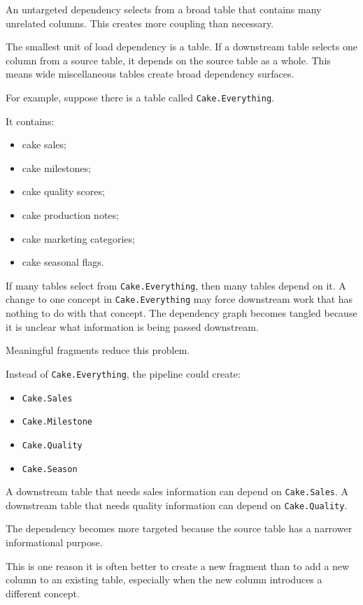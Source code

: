\documentclass[10pt,openany,10pt]{book}
\providecommand{\tightlist}{%
  \setlength{\itemsep}{0pt}\setlength{\parskip}{0pt}}
\begin{document}
An untargeted dependency selects from a broad table that contains many
unrelated columns. This creates more coupling than necessary.

The smallest unit of load dependency is a table. If a downstream table
selects one column from a source table, it depends on the source table
as a whole. This means wide miscellaneous tables create broad dependency
surfaces.

For example, suppose there is a table called \texttt{Cake.Everything}.

It contains:

\begin{itemize}
\tightlist
\item
  cake sales;
\item
  cake milestones;
\item
  cake quality scores;
\item
  cake production notes;
\item
  cake marketing categories;
\item
  cake seasonal flags.
\end{itemize}

If many tables select from \texttt{Cake.Everything}, then many tables
depend on it. A change to one concept in \texttt{Cake.Everything} may
force downstream work that has nothing to do with that concept. The
dependency graph becomes tangled because it is unclear what information
is being passed downstream.

Meaningful fragments reduce this problem.

Instead of \texttt{Cake.Everything}, the pipeline could create:

\begin{itemize}
\tightlist
\item
  \texttt{Cake.Sales}
\item
  \texttt{Cake.Milestone}
\item
  \texttt{Cake.Quality}
\item
  \texttt{Cake.Season}
\end{itemize}

A downstream table that needs sales information can depend on
\texttt{Cake.Sales}. A downstream table that needs quality information
can depend on \texttt{Cake.Quality}.

The dependency becomes more targeted because the source table has a
narrower informational purpose.

This is one reason it is often better to create a new fragment than to
add a new column to an existing table, especially when the new column
introduces a different concept.
\end{document}
